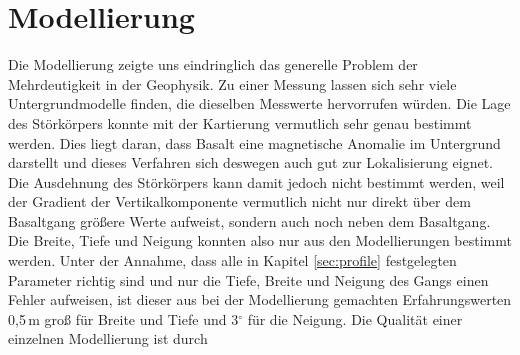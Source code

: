 \section{Modellierung}

Die Modellierung zeigte uns eindringlich das generelle Problem der Mehrdeutigkeit in der Geophysik. Zu einer Messung lassen sich sehr viele Untergrundmodelle finden, die dieselben Messwerte hervorrufen würden. Die Lage des Störkörpers konnte mit der Kartierung vermutlich sehr genau bestimmt werden. Dies liegt daran, dass Basalt eine magnetische Anomalie im Untergrund darstellt und dieses Verfahren sich deswegen auch gut zur Lokalisierung eignet. Die Ausdehnung des Störkörpers kann damit jedoch nicht bestimmt werden, weil der Gradient der Vertikalkomponente vermutlich nicht nur direkt über dem Basaltgang größere Werte aufweist, sondern auch noch neben dem Basaltgang. Die Breite, Tiefe und Neigung konnten also nur aus den Modellierungen bestimmt werden. Unter der Annahme, dass alle in Kapitel \ref{sec:profile} festgelegten Parameter richtig sind und nur die Tiefe, Breite und Neigung des Gangs einen Fehler aufweisen, ist dieser aus bei der Modellierung gemachten Erfahrungswerten 0,5\,m groß für Breite und Tiefe und 3$^\circ$ für die Neigung. Die Qualität einer einzelnen Modellierung ist durch 